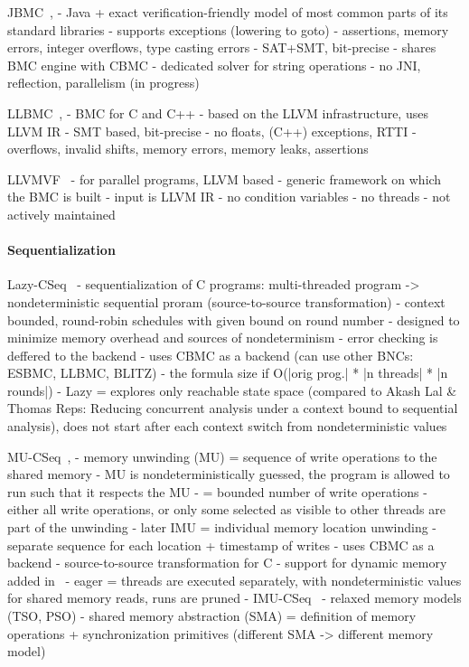 JBMC~\cite{Cordeiro2019}, \cite{Cordeiro2018}
- Java + exact verification-friendly model of most common parts of its standard libraries
- supports exceptions (lowering to goto)
- assertions, memory errors, integer overflows, type casting errors
- SAT+SMT, bit-precise
- shares BMC engine with CBMC
- dedicated solver for string operations
- no JNI, reflection, parallelism (in progress)

LLBMC~\cite{Merz2012}, \cite{Falke2013}
- BMC for C and C++
- based on the LLVM infrastructure, uses LLVM IR
- SMT based, bit-precise
- no floats, (C++) exceptions, RTTI
- overflows, invalid shifts, memory errors, memory leaks, assertions

LLVMVF~\cite{Sousa2013}
- for parallel programs, LLVM based
- generic framework on which the BMC is built
- input is LLVM IR
- no condition variables
- no threads
- not actively maintained 

\paragraph{Sequentialization}


Lazy-CSeq~\cite{Inverso2014}
- sequentialization of C programs: multi-threaded program -> nondeterministic sequential proram (source-to-source transformation)
- context bounded, round-robin schedules with given bound on round number
- designed to minimize memory overhead and sources of nondeterminism
- error checking is deffered to the backend
- uses CBMC as a backend (can use other BNCs: ESBMC, LLBMC, BLITZ)
- the formula size if O(|orig prog.| * |n threads| * |n rounds|)
- Lazy = explores only reachable state space (compared to Akash Lal \& Thomas Reps: Reducing concurrent analysis under a context bound to sequential analysis), does not start after each context switch from nondeterministic values

MU-CSeq~\cite{Tomasco2015}, \cite{Tomasco2016}
- memory unwinding (MU) = sequence of write operations to the shared memory
- MU is nondeterministically guessed, the program is allowed to run such that it respects the MU
- = bounded number of write operations 
  - either all write operations, or only some selected as visible to other threads are part of the unwinding
- later IMU = individual memory location unwinding
  - separate sequence for each location + timestamp of writes
- uses CBMC as a backend
- source-to-source transformation for C
- support for dynamic memory added in~\cite{Tomasco2016}
- eager = threads are executed separately, with nondeterministic values for shared memory reads, runs are pruned
- IMU-CSeq~\cite{Tomasco2017}
  - relaxed memory models (TSO, PSO)
  - shared memory abstraction (SMA) = definition of memory operations + synchronization primitives (different SMA -> different memory model)

